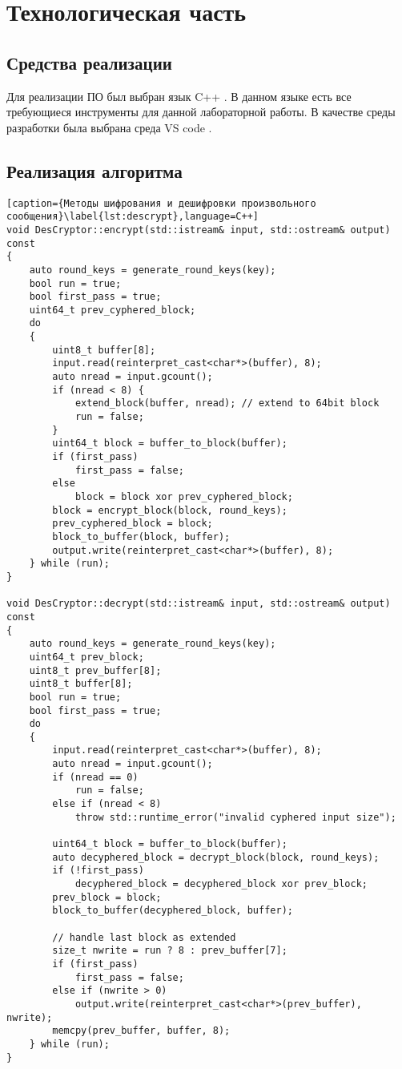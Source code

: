 \chapter{Технологическая часть}

\section{Средства реализации}

Для реализации ПО был выбран язык C++ \cite{C++}.
В данном языке есть все требующиеся инструменты для данной лабораторной работы.
В качестве среды разработки была выбрана среда VS code \cite{vscode}.

\section{Реализация алгоритма}

\begin{lstlisting}[caption={Методы шифрования и дешифровки произвольного сообщения}\label{lst:descrypt},language=C++]
void DesCryptor::encrypt(std::istream& input, std::ostream& output) const
{
    auto round_keys = generate_round_keys(key);
    bool run = true;
    bool first_pass = true;
    uint64_t prev_cyphered_block;
    do
    {
        uint8_t buffer[8];
        input.read(reinterpret_cast<char*>(buffer), 8);
        auto nread = input.gcount();
        if (nread < 8) {
            extend_block(buffer, nread); // extend to 64bit block
            run = false;
        }
        uint64_t block = buffer_to_block(buffer);
        if (first_pass)
            first_pass = false;
        else
            block = block xor prev_cyphered_block;
        block = encrypt_block(block, round_keys);
        prev_cyphered_block = block;
        block_to_buffer(block, buffer);
        output.write(reinterpret_cast<char*>(buffer), 8);
    } while (run);
}

void DesCryptor::decrypt(std::istream& input, std::ostream& output) const
{
    auto round_keys = generate_round_keys(key);
    uint64_t prev_block;
    uint8_t prev_buffer[8];
    uint8_t buffer[8];
    bool run = true;
    bool first_pass = true;
    do
    {
        input.read(reinterpret_cast<char*>(buffer), 8);
        auto nread = input.gcount();
        if (nread == 0)
            run = false;
        else if (nread < 8)
            throw std::runtime_error("invalid cyphered input size");

        uint64_t block = buffer_to_block(buffer);
        auto decyphered_block = decrypt_block(block, round_keys);
        if (!first_pass)
            decyphered_block = decyphered_block xor prev_block;
        prev_block = block;
        block_to_buffer(decyphered_block, buffer);

        // handle last block as extended
        size_t nwrite = run ? 8 : prev_buffer[7];
        if (first_pass)
            first_pass = false;
        else if (nwrite > 0)
            output.write(reinterpret_cast<char*>(prev_buffer), nwrite);
        memcpy(prev_buffer, buffer, 8);
    } while (run);
}
\end{lstlisting}

